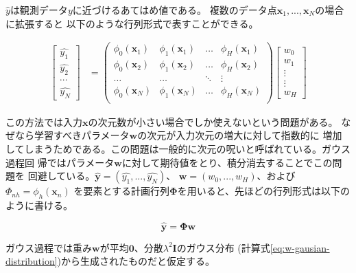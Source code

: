 $\hat{y}$は観測データ$y$に近づけるあてはめ値である。
複数のデータ点$\boldsymbol{x}_{1}, ..., \boldsymbol{x}_{N}$の場合に拡張すると
以下のような行列形式で表すことができる。

\begin{align}
\begin{bmatrix}
	\hat{y_{1}} \\
	\hat{y_{2}} \\
	\cdots \\
	\hat{y_{N}}
\end{bmatrix}
&= \begin{pmatrix}
		\phi_{0}(\boldsymbol{x}_{1}) & \phi_{1}(\boldsymbol{x}_{1}) & \dots & \phi_{H}(\boldsymbol{x}_{1}) \\
		\phi_{0}(\boldsymbol{x}_{2}) & \phi_{1}(\boldsymbol{x}_{2}) & \dots & \phi_{H}(\boldsymbol{x}_{2}) \\
		\dots & \dots & \ddots & \vdots \\
		\phi_{0}(\boldsymbol{x}_{N}) & \phi_{1}(\boldsymbol{x}_{N}) & \dots & \phi_{H}(\boldsymbol{x}_{N}) \\
   \end{pmatrix}
   \begin{bmatrix}
	  w_{0} \\
	  w_{1} \\
	  \vdots \\
	  \vdots \\
	  w_{H}
   \end{bmatrix}
\end{align}

この方法では入力$\boldsymbol{x}$の次元数が小さい場合でしか使えないという問題がある。
なぜなら学習すべきパラメータ$\boldsymbol{w}$の次元が入力次元の増大に対して指数的に
増加してしまうためである。この問題は一般的に次元の呪いと呼ばれている。ガウス過程回
帰ではパラメータ$\boldsymbol{w}$に対して期待値をとり、積分消去することでこの問題を
回避している。$\boldsymbol{\hat{y}} = (\hat{y_{1}}, ..., \hat{y_{N}})$、
$\boldsymbol{w} = (w_{0}, ..., w_{H})$、および$\Phi_{nh} = \phi_{h}(\boldsymbol{x}_{n})$
を要素とする計画行列$\boldsymbol{\Phi}$を用いると、先ほどの行列形式は以下のように書ける。

\begin{equation}\label{eq:y-equals-phi-w}
\boldsymbol{\hat{y}} = \boldsymbol{\Phi}\boldsymbol{w}
\end{equation}

ガウス過程では重み$\boldsymbol{w}$が平均$\boldsymbol{0}$、分散$\lambda^2\boldsymbol{I}$のガウス分布
(計算式\ref{eq:w-gausian-distribution})から生成されたものだと仮定する。

